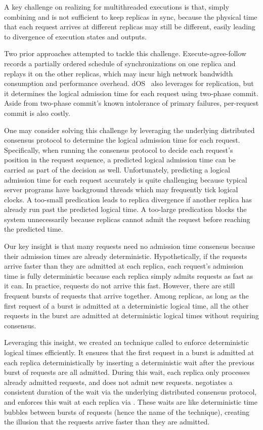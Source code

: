 A key challenge on realizing \smr for multithreaded executions is that,
simply combining \paxos and \dmt is not sufficient to keep replicas in
sync, because the physical time that each request arrives at different
replicas may still be different, easily leading to divergence of execution
states and outputs.

Two prior approaches attempted to tackle this challenge.  
Execute-agree-follow~\cite{rex:eurosys14} records a partially
ordered schedule of \pthread synchronizations on one replica and replays it 
on the other replicas, which may incur high network bandwidth 
consumption and performance overhead. dOS~\cite{dos:osdi10} also leverages
\dmt for replication, but it determines the logical admission time for
each request using two-phase commit.  Aside from two-phase commit's known
intolerance of primary failures, per-request commit is also costly.

One may consider solving this challenge by leveraging the underlying
distributed consensus protocol to determine the logical admission time for each
request.  Specifically, when running the consensus protocol to decide each
request's position in the request sequence, a predicted logical admission time 
can be carried as part of the decision as well. Unfortunately, 
predicting a logical admission time for each request accurately is quite 
challenging because typical server programs have background threads which 
may frequently tick logical clocks. A too-small predication leads to 
replica divergence if another replica has already run past the predicted 
logical time. A too-large predication blocks the system unnecessarily 
because replicas cannot admit the request before reaching the predicted time.

Our key insight is that many requests need no admission time consensus
because their admission times are already deterministic.  Hypothetically,
if the requests arrive faster than they are admitted at each replica, each
request's admission time is fully deterministic because each replica
simply admits requests as fast as it can. In practice, requests do not arrive 
this fast.  However, there are still frequent bursts of requests that arrive 
together. Among replicas, as long as the first request of a burst is admitted at 
a deterministic logical time, all the other requests in the burst are admitted 
at deterministic logical times without requiring consensus.

Leveraging this insight, we created an technique called \emph{\timealgo} to 
enforce deterministic logical times efficiently.  It ensures that the 
first request in a burst is admitted at each replica deterministically by 
inserting a deterministic wait after the previous burst of requests are all 
admitted.  During this wait, each replica only processes already admitted 
requests, and does not admit new requests.  \xxx negotiates a consistent 
duration of the wait via the underlying distributed consensus protocol, and 
enforces this wait at each replica via \dmt.  These waits are like 
deterministic time bubbles between bursts of requests (hence the name of the 
technique), creating the illusion that the requests arrive faster than they are 
admitted.


